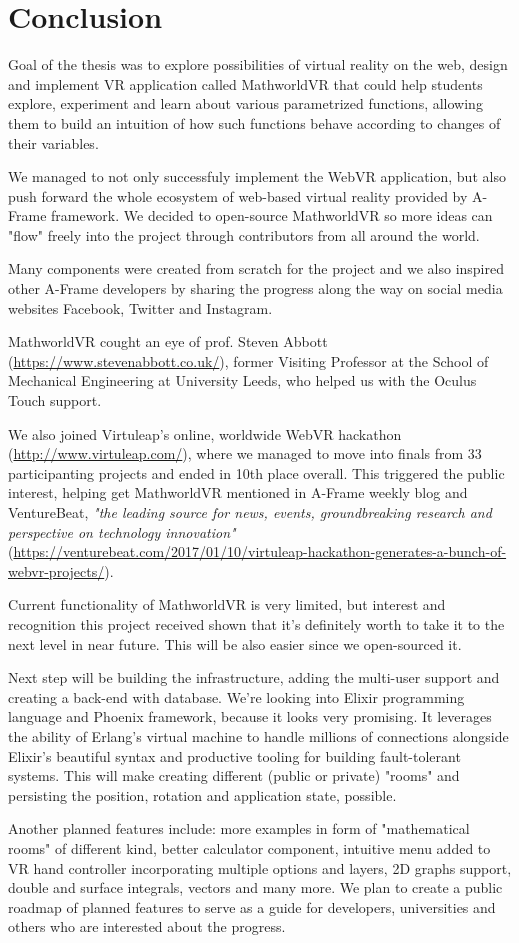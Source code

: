 \section{Conclusion}
Goal of the thesis was to explore possibilities of virtual reality on the web, design and implement VR application called MathworldVR that could help students explore, experiment and learn about various parametrized functions, allowing them to build an intuition of how such functions behave according to changes of their variables.

We managed to not only successfuly implement the WebVR application, but also push forward the whole ecosystem of web-based virtual reality provided by A-Frame framework. We decided to open-source MathworldVR so more ideas can "flow" freely into the project through contributors from all around the world.

Many components were created from scratch for the project and we also inspired other A-Frame developers by sharing the progress along the way on social media websites Facebook, Twitter and Instagram.

MathworldVR cought an eye of prof. Steven Abbott (\url{https://www.stevenabbott.co.uk/}), former Visiting Professor at the School of Mechanical Engineering at University Leeds, who helped us with the Oculus Touch support.

We also joined Virtuleap's online, worldwide WebVR hackathon (\url{http://www.virtuleap.com/}), where we managed to move into finals from 33 participanting projects and ended in 10th place overall. This triggered the public interest, helping get MathworldVR mentioned in A-Frame weekly blog and VentureBeat, \textsl{"the leading source for news, events, groundbreaking research and perspective on technology innovation"} (\url{https://venturebeat.com/2017/01/10/virtuleap-hackathon-generates-a-bunch-of-webvr-projects/}).

Current functionality of MathworldVR is very limited, but interest and recognition this project received shown that it's definitely worth to take it to the next level in near future. This will be also easier since we open-sourced it. 

Next step will be building the infrastructure, adding the multi-user support and creating a back-end with database. We're looking into Elixir programming language and Phoenix framework, because it looks very promising. It leverages the ability of Erlang's virtual machine to handle millions of connections alongside Elixir's beautiful syntax and productive tooling for building fault-tolerant systems. This will make creating different (public or private) "rooms" and persisting the position, rotation and application state, possible.

Another planned features include: more examples in form of "mathematical rooms" of different kind, better calculator component, intuitive menu added to VR hand controller incorporating multiple options and layers, 2D graphs support, double and surface integrals, vectors and many more. We plan to create a public roadmap of planned features to serve as a guide for developers, universities and others who are interested about the progress.